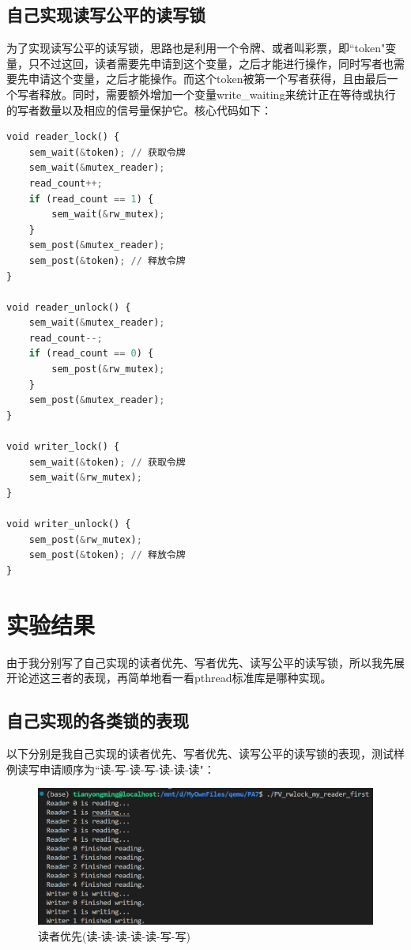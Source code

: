 \documentclass{LabReport}
\begin{document}
\subsection{自己实现读写公平的读写锁}

为了实现读写公平的读写锁，思路也是利用一个令牌、或者叫彩票，即``token"变量，只不过这回，读者需要先申请到这个变量，之后才能进行操作，同时写者也需要先申请这个变量，之后才能操作。而这个token被第一个写者获得，且由最后一个写者释放。同时，需要额外增加一个变量write\_waiting来统计正在等待或执行的写者数量以及相应的信号量保护它。核心代码如下：

\begin{lstlisting}[language=python,frame=shadowbox]
void reader_lock() {
	sem_wait(&token); // 获取令牌
	sem_wait(&mutex_reader);
	read_count++;
	if (read_count == 1) {
		sem_wait(&rw_mutex);
	}
	sem_post(&mutex_reader);
	sem_post(&token); // 释放令牌
}

void reader_unlock() {
	sem_wait(&mutex_reader);
	read_count--;
	if (read_count == 0) {
		sem_post(&rw_mutex);
	}
	sem_post(&mutex_reader);
}

void writer_lock() {
	sem_wait(&token); // 获取令牌
	sem_wait(&rw_mutex);
}

void writer_unlock() {
	sem_post(&rw_mutex);
	sem_post(&token); // 释放令牌
}
\end{lstlisting}

	\section{实验结果}
	
	由于我分别写了自己实现的读者优先、写者优先、读写公平的读写锁，所以我先展开论述这三者的表现，再简单地看一看pthread标准库是哪种实现。
	
	\subsection{自己实现的各类锁的表现}
	以下分别是我自己实现的读者优先、写者优先、读写公平的读写锁的表现，测试样例读写申请顺序为``读-写-读-写-读-读-读"：\newpage\par
\begin{figure}[h!]
	\centering
	\includegraphics[width=0.85\linewidth]{figures/my_reader_first}
	\caption{读者优先(读-读-读-读-读-写-写)}
	\label{fig:myreaderfirst}
\end{figure}
	
\end{document}
